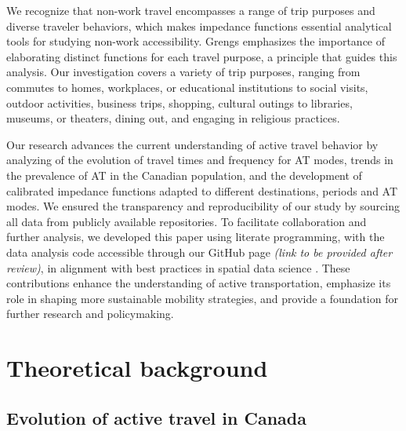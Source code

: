 \documentclass[preprint, 3p,
authoryear]{elsarticle} %
\begin{document}
We recognize that non-work travel encompasses a range of trip purposes
and diverse traveler behaviors, which makes impedance functions
essential analytical tools for studying non-work accessibility. Grengs
\citeyearpar{grengs2015nonwork} emphasizes the importance of elaborating
distinct functions for each travel purpose, a principle that guides this
analysis. Our investigation covers a variety of trip purposes, ranging
from commutes to homes, workplaces, or educational institutions to
social visits, outdoor activities, business trips, shopping, cultural
outings to libraries, museums, or theaters, dining out, and engaging in
religious practices.

Our research advances the current understanding of active travel
behavior by analyzing of the evolution of travel times and frequency for
AT modes, trends in the prevalence of AT in the Canadian population, and
the development of calibrated impedance functions adapted to different
destinations, periods and AT modes. We ensured the transparency and
reproducibility of our study by sourcing all data from publicly
available repositories. To facilitate collaboration and further
analysis, we developed this paper using literate programming, with the
data analysis code accessible through our GitHub page \emph{(link to be
provided after review)}, in alignment with best practices in spatial
data science \citep{arribas-bel2021}. These contributions enhance the
understanding of active transportation, emphasize its role in shaping
more sustainable mobility strategies, and provide a foundation for
further research and policymaking.

\section{Theoretical background}\label{theoretical-background}

\subsection{Evolution of active travel in
Canada}\label{evolution-of-active-travel-in-canada}
\end{document}
